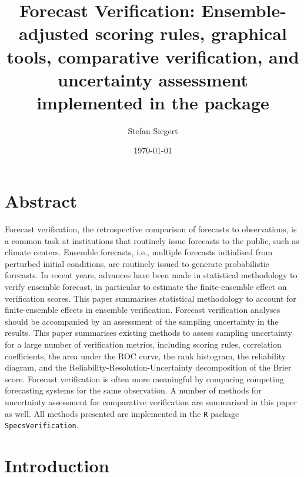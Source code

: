 \documentclass[10pt]{article}\usepackage[]{graphicx}\usepackage[]{color}
\author{Stefan Siegert}
\title{Forecast Verification: Ensemble-adjusted scoring rules, graphical tools, comparative verification, and uncertainty assessment implemented in the \proglang{R} package \pkg{SpecsVerification}}
\date{\today}
\newcommand{\proglang}[1]{\texttt{#1}}
\newcommand{\pkg}[1]{\texttt{#1}}
\begin{document}
\maketitle

\section*{Abstract}

Forecast verification, the retrospective comparison of forecasts to observations, is a common task at institutions that routinely issue forecasts to the public, such as climate centers.
Ensemble forecasts, i.e., multiple forecasts initialised from perturbed initial conditions, are routinely issued to generate probabilistic forecasts.
In recent years, advances have been made in statistical methodology to verify ensemble forecast, in particular to estimate the finite-ensemble effect on verification scores.
This paper summarises statistical methodology to account for finite-ensemble effects in ensemble verification. 
Forecast verification analyses should be accompanied by an assessment of the sampling uncertainty in the results.
This paper summarises existing methods to assess sampling uncertainty for a large number of verification metrics, including scoring rules, correlation coefficients, the area under the ROC curve, the rank histogram, the reliability diagram, and the Reliability-Resolution-Uncertainty decomposition of the Brier score.
Forecast verification is often more meaningful by comparing competing forecasting systems for the same observation.
A number of methods for uncertainty assessment for comparative verification are summarised in this paper as well.
All methods presented are implemented in the \proglang{R} package \pkg{SpecsVerification}.









\section{Introduction}
\end{document}
